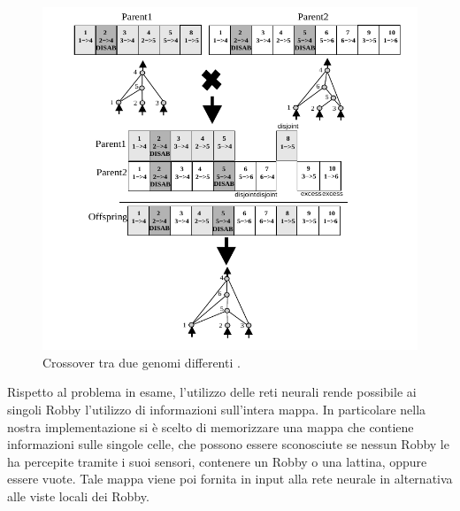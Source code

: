 \begin{figure}[H]
	\includegraphics[width=\textwidth]{img/neat-crossover.png}
	\caption{Crossover tra due genomi differenti \cite{stanley2002evolving}.}
	\label{fig:neatcrossover}
\end{figure}

Rispetto al problema in esame, l'utilizzo delle reti neurali rende possibile ai 
singoli Robby l'utilizzo di informazioni sull'intera mappa. In particolare 
nella 
nostra implementazione si è scelto di memorizzare una mappa che contiene 
informazioni sulle singole celle, che possono essere sconosciute se nessun 
Robby le ha percepite tramite i suoi sensori, contenere un Robby o una 
lattina, oppure essere vuote. Tale mappa viene poi fornita in input alla rete 
neurale in alternativa alle viste locali dei Robby.